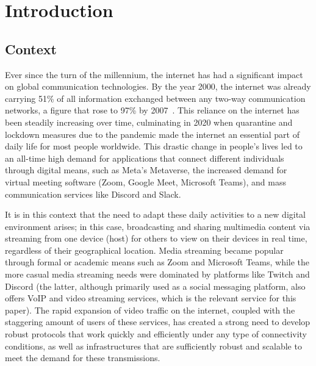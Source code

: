 \documentclass{article}
\begin{document}
\newpage
{}
\setlength{\parindent}{20pt}

\section{Introduction}

\subsection{Context}
Ever since the turn of the millennium, the internet has had a significant impact on global communication technologies. By the year 2000, the internet was
already carrying 51\% of all information exchanged between any two-way communication networks, a figure that rose to 97\% by 2007~\cite{tech_capacity}.
This reliance on the internet has been steadily increasing over time, culminating in 2020 when quarantine and lockdown measures due to the pandemic 
made the internet an essential part of daily life for most people worldwide. This drastic change in people's lives led to an all-time high demand for 
applications that connect different individuals through digital means, such as Meta's Metaverse, the increased demand for virtual meeting software 
(Zoom, Google Meet, Microsoft Teams), and mass communication services like Discord and Slack.

\vspace{1em}

It is in this context that the need to adapt these daily activities to a new digital environment arises; in this case, broadcasting and sharing multimedia 
content via streaming from one device (host) for others to view on their devices in real time, regardless of their geographical location.
Media streaming became popular through formal or academic means such as Zoom and Microsoft Teams, while the more casual media streaming needs were 
dominated by platforms like Twitch and Discord (the latter, although primarily used as a social messaging platform, also offers VoIP and video 
streaming services, which is the relevant service for this paper). The rapid expansion of video traffic on the internet, coupled with the staggering amount
of users of these services, has created a strong need to develop robust protocols that work quickly and efficiently under any type of connectivity conditions, as well 
as infrastructures that are sufficiently robust and scalable to meet the demand for these transmissions. 

\vspace{1em}
\end{document}

